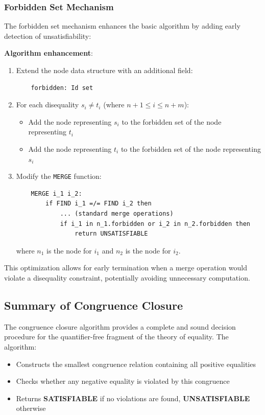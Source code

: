\documentclass[11pt,a4paper]{article}
\theoremstyle{definition}
\theoremstyle{plain}
\theoremstyle{remark}
\begin{document}
\subsubsection{Forbidden Set Mechanism}

The forbidden set mechanism enhances the basic algorithm by adding early detection of unsatisfiability:

\begin{tcolorbox}[colback=purple!5!white,colframe=purple!75!black,title=\textbf{Forbidden Set Implementation}]
\textbf{Algorithm enhancement}:

\begin{enumerate}
    \item Extend the node data structure with an additional field:
    \begin{verbatim}
    forbidden: Id set
    \end{verbatim}

    \item For each disequality $s_i \neq t_i$ (where $n+1 \leq i \leq n+m$):
    \begin{itemize}
        \item Add the node representing $s_i$ to the forbidden set of the node representing $t_i$
        \item Add the node representing $t_i$ to the forbidden set of the node representing $s_i$
    \end{itemize}

    \item Modify the \texttt{MERGE} function:
    \begin{verbatim}
    MERGE i_1 i_2:
        if FIND i_1 =/= FIND i_2 then
            ... (standard merge operations)
            if i_1 in n_1.forbidden or i_2 in n_2.forbidden then
                return UNSATISFIABLE
    \end{verbatim}
    where $n_1$ is the node for $i_1$ and $n_2$ is the node for $i_2$.
\end{enumerate}
\end{tcolorbox}

This optimization allows for early termination when a merge operation would violate a disequality constraint, potentially avoiding unnecessary computation.

\subsection{Summary of Congruence Closure}

The congruence closure algorithm provides a complete and sound decision procedure for the quantifier-free fragment of the theory of equality. The algorithm:
\begin{itemize}
    \item Constructs the smallest congruence relation containing all positive equalities
    \item Checks whether any negative equality is violated by this congruence
    \item Returns \textbf{SATISFIABLE} if no violations are found, \textbf{UNSATISFIABLE} otherwise
\end{itemize}
\end{document}

